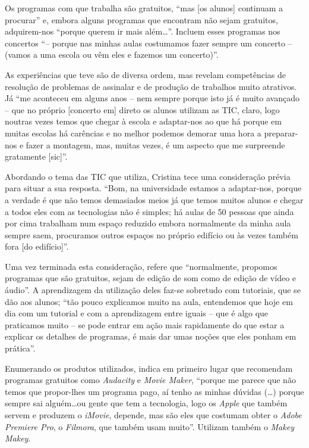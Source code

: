 \documentclass{textolivre}
\begin{document}
Os programas com que trabalha são gratuitos, “mas [os alunos] continuam a
procurar” e, embora alguns programas que encontram não sejam gratuitos,
adquirem-nos “porque querem ir mais além\ldots”. Incluem esses programas nos
concertos “– porque nas minhas aulas costumamos fazer sempre um concerto –
(vamos a uma escola ou vêm eles e fazemos um concerto)”.

As experiências que teve são de diversa ordem, mas revelam competências de
resolução de problemas de assinalar e de produção de trabalhos muito atrativos.
Já “me aconteceu em alguns anos – nem sempre porque isto já é muito avançado –
que no próprio [concerto em] direto os alunos utilizam as TIC, claro, logo
noutras vezes temos que chegar à escola e adaptar-nos ao que há porque em
muitas escolas há carências e no melhor podemos demorar uma hora a preparar-nos
e fazer a montagem, mas, muitas vezes, é um aspecto que me surpreende
gratamente [sic]”.

Abordando o tema das TIC que utiliza, Cristina tece uma consideração prévia
para situar a sua resposta. “Bom, na universidade estamos a adaptar-nos, porque
a verdade é que não temos demasiados meios já que temos muitos alunos e chegar
a todos eles com as tecnologias não é simples; há aulas de 50 pessoas que ainda
por cima trabalham num espaço reduzido embora normalmente da minha aula sempre
saem, procuramos outros espaços no próprio edifício ou às vezes também fora [do
edifício]”.

Uma vez terminada esta consideração, refere que “normalmente, propomos
programas que são gratuitos, sejam de edição de som como de edição de vídeo e
áudio”. A aprendizagem da utilização deles faz-se sobretudo com tutoriais, que
se dão aos alunos; “tão pouco explicamos muito na aula, entendemos que hoje em
dia com um tutorial e com a aprendizagem entre iguais – que é algo que
praticamos muito – se pode entrar em ação mais rapidamente do que estar a
explicar os detalhes de programas, é mais dar umas noções que eles ponham em
prática”.

Enumerando os produtos utilizados, indica em primeiro lugar que recomendam
programas gratuitos como \textit{Audacity} e \textit{Movie Maker}, “porque me
parece que não temos que propor-lhes um programa pago, aí tenho as minhas
dúvidas (\ldots) porque sempre sai alguém\ldots ou gente que tem a tecnologia, logo
os \textit{Apple} que também servem e produzem o \textit{iMovie}, depende, mas
são eles que costumam obter o \textit{Adobe Premiere Pro}, o \textit{Filmora},
que também usam muito”. Utilizam também o \textit{Makey Makey}.
\end{document}
